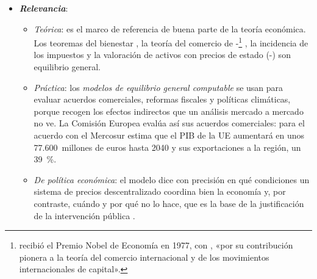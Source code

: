 \documentclass[11pt]{article}
\begin{document}
\begin{itemize}
\begin{itemize}
{\begin{itemize}
\item según el poder de mercado de los agentes, en \emph{competitivos} y con competencia imperfecta (oligopolio , competencia monopolística );
\item según el origen de los bienes, en modelos de \emph{intercambio puro}, en los que las dotaciones de bienes son exógenas, y modelos \emph{con producción}, en los que los bienes salen de la actividad de las empresas.
\end{itemize}} el bloque~\ref{sec:otros-desarrollos-posteriores} levanta algunos de sus supuestos.
  \end{itemize}

\item \textbf{\emph{Relevancia}}:
  \begin{itemize}
  \item \emph{Teórica}: es el marco de referencia de buena parte de la teoría económica. Los teoremas del bienestar , la teoría del comercio de -\footnote{ recibió el Premio Nobel de Economía en 1977, con , «por su contribución pionera a la teoría del comercio internacional y de los movimientos internacionales de capital»\nocite{Nobel1977MeadeOhlin}.} , la incidencia de los impuestos  y la valoración de activos con precios de estado (-) son equilibrio general.
  \item \emph{Práctica}: los \emph{modelos de equilibrio general computable} se usan para evaluar acuerdos comerciales, reformas fiscales y políticas climáticas, porque recogen los efectos indirectos que un análisis mercado a mercado no ve. La Comisión Europea evalúa así sus acuerdos comerciales: para el acuerdo con el Mercosur estima que el PIB de la UE aumentará en unos 77.600~millones de euros hasta 2040 y sus exportaciones a la región, un 39~\%\nocite{CE2025MercosurAnalisis}.
  \item \emph{De política económica}: el modelo dice con precisión en qué condiciones un sistema de precios descentralizado coordina bien la economía y, por contraste, cuándo y por qué no lo hace, que es la base de la justificación de la intervención pública .
  \end{itemize}


\end{itemize}
\end{document}
